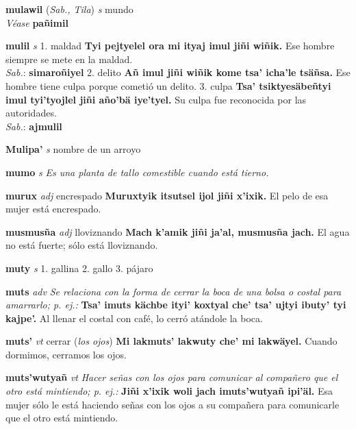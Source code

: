 \documentclass[10pt]{scrbook}
\newcommand{\entry}[1]{\textbf{#1}}
\newcommand{\onedefinition}[1]{#1.}
\newcommand{\nontranslationdef}[1]{\textit{#1}}
\newcommand{\partofspeech}[1]{\textit{#1}}
\newcommand{\spanishtranslation}[1]{#1}
\newcommand{\clarification}[1]{(\textit{#1})}
\newcommand{\cholexample}[1]{\textbf{#1}}
\newcommand{\exampletranslation}[1]{#1}
\newcommand{\dialectvariant}[1]{\\\textit{#1}:}
\newcommand{\dialectword}[1]{\textbf{#1}}
\newcommand{\alsosee}[1]{\\\textit{Véase} \textbf{#1}}
\newcommand{\relevantdialect}[1]{(\textit{#1})}
\begin{document}
\begin{multicols}{2}
\entry{mulawil}
\relevantdialect{Sab., Tila}
\partofspeech{s}
\spanishtranslation{mundo}
\alsosee{pañimil}

\entry{mulil}
\partofspeech{s}
\onedefinition{1}
\spanishtranslation{maldad}
\cholexample{Tyi pejtyelel ora mi ityaj imul jiñi wiñik.}
\exampletranslation{Ese hombre siempre se mete en la maldad.}
\dialectvariant{Sab.}
\dialectword{simaroñiyel}
\onedefinition{2}
\spanishtranslation{delito}
\cholexample{Añ imul jiñi wiñik kome tsa' icha'le tsäñsa.}
\exampletranslation{Ese hombre tiene culpa porque cometió un delito.}
\onedefinition{3}
\spanishtranslation{culpa}
\cholexample{Tsa' tsiktyesäbeñtyi imul tyi'tyojlel jiñi año'bä iye'tyel.}
\exampletranslation{Su culpa fue reconocida por las autoridades.}
\dialectvariant{Sab.}
\dialectword{ajmulil}

\entry{Mulipa'}
\partofspeech{s}
\spanishtranslation{nombre de un arroyo}

\entry{mumo}
\partofspeech{s}
\nontranslationdef{Es una planta de tallo comestible cuando está tierno.}

\entry{murux}
\partofspeech{adj}
\spanishtranslation{encrespado}
\cholexample{Muruxtyik itsutsel ijol jiñi x'ixik.}
\exampletranslation{El pelo de esa mujer está encrespado.}

\entry{musmusña}
\partofspeech{adj}
\spanishtranslation{lloviznando}
\cholexample{Mach k'amik jiñi ja'al, musmusña jach.}
\exampletranslation{El agua no está fuerte; sólo está lloviznando.}

\entry{muty}
\partofspeech{s}
\onedefinition{1}
\spanishtranslation{gallina}
\onedefinition{2}
\spanishtranslation{gallo}
\onedefinition{3}
\spanishtranslation{pájaro}

\entry{muts}
\partofspeech{adv}
\nontranslationdef{Se relaciona con la forma de cerrar la boca de una bolsa o costal para amarrarlo; p. ej.:}
\cholexample{Tsa' imuts kächbe ityi' koxtyal che' tsa' ujtyi ibuty' tyi kajpe'.}
\exampletranslation{Al llenar el costal con café, lo cerró atándole la boca.}

\entry{muts'}
\partofspeech{vt}
\spanishtranslation{cerrar}
\clarification{los ojos}
\cholexample{Mi lakmuts' lakwuty che' mi lakwäyel.}
\exampletranslation{Cuando dormimos, cerramos los ojos.}

\entry{muts'wutyañ}
\partofspeech{vt}
\nontranslationdef{Hacer señas con los ojos para comunicar al compañero que el otro está mintiendo; p. ej.:}
\cholexample{Jiñi x'ixik woli jach imuts'wutyañ ipi'äl.}
\exampletranslation{Esa mujer sólo le está haciendo señas con los ojos a su compañera para comunicarle que el otro está mintiendo.}


\end{multicols}
\end{document}
